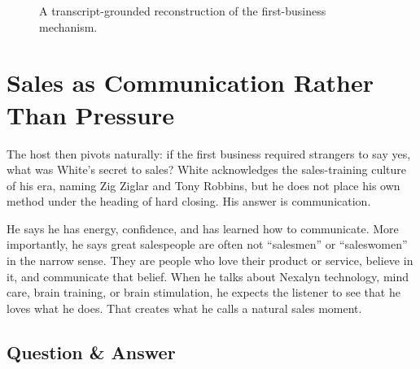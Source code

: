 \begin{figure}
\centering
{}
\caption{A transcript-grounded reconstruction of the first-business mechanism.}
\end{figure}

\section{Sales as Communication Rather Than Pressure}

The host then pivots naturally: if the first business required strangers to say yes, what was White's secret to sales? White acknowledges the sales-training culture of his era, naming Zig Ziglar and Tony Robbins, but he does not place his own method under the heading of hard closing. His answer is communication.

He says he has energy, confidence, and has learned how to communicate. More importantly, he says great salespeople are often not ``salesmen'' or ``saleswomen'' in the narrow sense. They are people who love their product or service, believe in it, and communicate that belief. When he talks about Nexalyn technology, mind care, brain training, or brain stimulation, he expects the listener to see that he loves what he does. That creates what he calls a natural sales moment.

\subsection{Question \& Answer}

